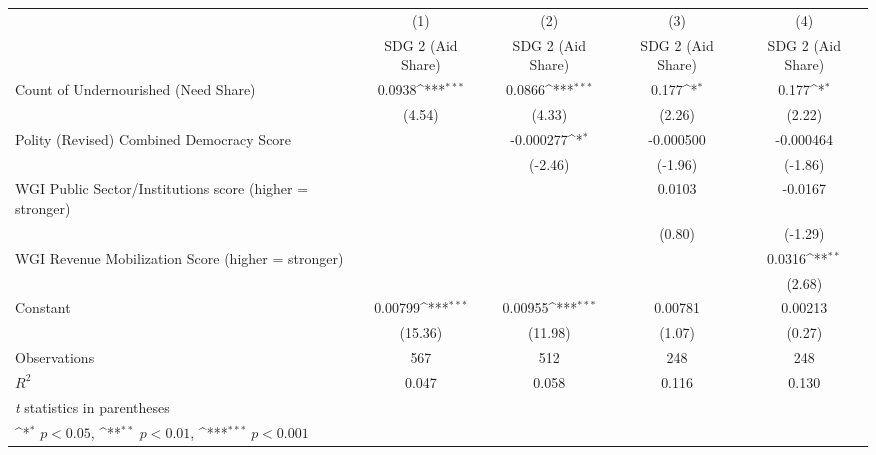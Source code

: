 {
\def\sym#1{\ifmmode^{#1}\else\(^{#1}\)\fi}
\begin{tabular}{l*{4}{c}}
\hline\hline
                &\multicolumn{1}{c}{(1)}&\multicolumn{1}{c}{(2)}&\multicolumn{1}{c}{(3)}&\multicolumn{1}{c}{(4)}\\
                &\multicolumn{1}{c}{SDG 2 (Aid Share)}&\multicolumn{1}{c}{SDG 2 (Aid Share)}&\multicolumn{1}{c}{SDG 2 (Aid Share)}&\multicolumn{1}{c}{SDG 2 (Aid Share)}\\
\hline
Count of Undernourished (Need Share)&   0.0938\sym{***}&   0.0866\sym{***}&    0.177\sym{*}  &    0.177\sym{*}  \\
                &   (4.54)         &   (4.33)         &   (2.26)         &   (2.22)         \\
[1em]
Polity (Revised) Combined Democracy Score&                  &-0.000277\sym{*}  &-0.000500         &-0.000464         \\
                &                  &  (-2.46)         &  (-1.96)         &  (-1.86)         \\
[1em]
WGI Public Sector/Institutions score (higher = stronger)&                  &                  &   0.0103         &  -0.0167         \\
                &                  &                  &   (0.80)         &  (-1.29)         \\
[1em]
WGI Revenue Mobilization Score (higher = stronger)&                  &                  &                  &   0.0316\sym{**} \\
                &                  &                  &                  &   (2.68)         \\
[1em]
Constant        &  0.00799\sym{***}&  0.00955\sym{***}&  0.00781         &  0.00213         \\
                &  (15.36)         &  (11.98)         &   (1.07)         &   (0.27)         \\
\hline
Observations    &      567         &      512         &      248         &      248         \\
\(R^{2}\)       &    0.047         &    0.058         &    0.116         &    0.130         \\
\hline\hline
\multicolumn{5}{l}{\footnotesize \textit{t} statistics in parentheses}\\
\multicolumn{5}{l}{\footnotesize \sym{*} \(p<0.05\), \sym{**} \(p<0.01\), \sym{***} \(p<0.001\)}\\
\end{tabular}
}

